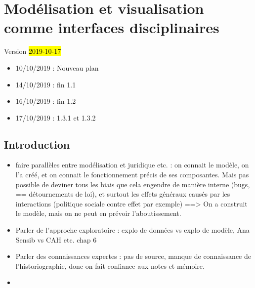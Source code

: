 %

\chapter{Modélisation et visualisation comme interfaces disciplinaires}
\label{chap:chap1}
\begin{center}
	{\large Version \hl{2019-10-17}}
\end{center}

\begin{itemize}
	\item 10/10/2019 : Nouveau plan
	\item 14/10/2019 : fin 1.1
	\item 16/10/2019 : fin 1.2
	\item 17/10/2019 : 1.3.1 et 1.3.2
\end{itemize} 

\minitoc

\clearpage
\section*{Introduction}

\begin{itemize}
	\item faire parallèles entre modélisation et juridique etc. : on connait le modèle, on l'a créé, et on connait le fonctionnement précis de ses composantes. Mais pas possible de deviner tous les biais que cela engendre de manière interne (bugs, == détournements de loi), et surtout les effets généraux causés par les interactions (politique sociale contre effet par exemple) ==> On a construit le modèle, mais on ne peut en prévoir l'aboutissement.
	\item Parler de l'approche exploratoire : explo de données vs explo de modèle, Ana Sensib vs CAH etc. chap  6
	\item Parler des connaissances expertes : pas de source, manque de connaissance de l'historiographie, donc on fait confiance aux notes et mémoire.
	\item 
\end{itemize}


